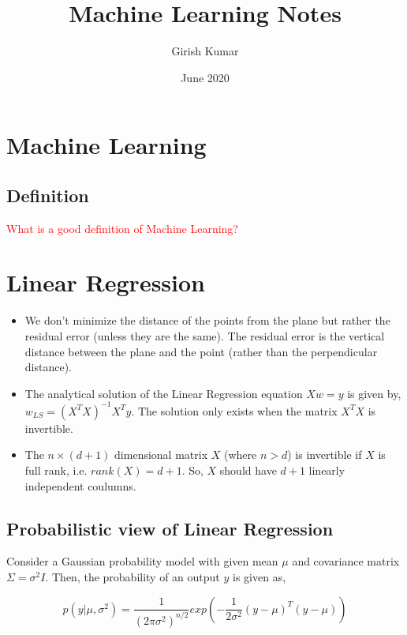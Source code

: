 \documentclass{article}
\title{Machine Learning Notes}
\author{Girish Kumar }
\date{June 2020}
\newcommand{\red}[1]{\textcolor{red}{#1}}
\begin{document}
\maketitle

\setcounter{secnumdepth}{0}
\tableofcontents

\section{Machine Learning}
\subsection{Definition}
\red{What is a good definition of Machine Learning?}



\section{Linear Regression}

\begin{itemize}
    \item We don't minimize the distance of the points from the plane but rather the residual error (unless they are the same). The residual error is the vertical distance between the plane and the point (rather than the perpendicular distance).
    
    \item The analytical solution of the Linear Regression equation $Xw=y$ is given by, $w_{LS}=(X^TX)^{-1}X^Ty$. The solution only exists when the matrix $X^TX$ is invertible.
    
    \item The $n \times (d+1)$ dimensional matrix $X$ (where $n>d$) is invertible if $X$ is full rank, i.e. $rank(X)=d+1$. So, $X$ should have $d+1$ linearly independent coulumns.
\end{itemize}

\subsection{Probabilistic view of Linear Regression}

Consider a Gaussian probability model with given mean $\mu$ and covariance matrix $\Sigma = \sigma^2I$. Then, the probability of an output $y$ is given as,

\begin{equation*}
    p(y\vert \mu, \sigma^2) = \frac{1}{(2\pi\sigma^2)^{n/2}}exp\left(-\frac{1}{2\sigma^2}(y-\mu)^T(y-\mu)\right) 
\end{equation*}
\end{document}
